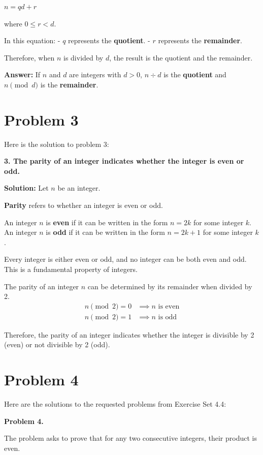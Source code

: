 \documentclass{article}
\begin{document}
$n = qd + r$

where $0 \le r < d$.

In this equation:
- $q$ represents the \textbf{quotient}.
- $r$ represents the \textbf{remainder}.

Therefore, when $n$ is divided by $d$, the result is the quotient and the remainder.

\textbf{Answer:}
If $n$ and $d$ are integers with $d > 0$, $n \div d$ is the \textbf{quotient} and $n \pmod{d}$ is the \textbf{remainder}.

\newpage

\section*{\textbf{Problem 3}}
Here is the solution to problem 3:

\textbf{3. The parity of an integer indicates whether the integer is even or odd.}

\textbf{Solution:}
Let $n$ be an integer.

\textbf{Parity} refers to whether an integer is even or odd.

An integer $n$ is \textbf{even} if it can be written in the form $n = 2k$ for some integer $k$.
An integer $n$ is \textbf{odd} if it can be written in the form $n = 2k + 1$ for some integer $k$.

Every integer is either even or odd, and no integer can be both even and odd. This is a fundamental property of integers.

The parity of an integer $n$ can be determined by its remainder when divided by 2.
\begin{align}
n \pmod{2} = 0 &\implies n \text{ is even} \\
n \pmod{2} = 1 &\implies n \text{ is odd}
\end{align}

Therefore, the parity of an integer indicates whether the integer is divisible by 2 (even) or not divisible by 2 (odd).

\newpage

\section*{\textbf{Problem 4}}
Here are the solutions to the requested problems from Exercise Set 4.4:

\textbf{Problem 4.}

The problem asks to prove that for any two consecutive integers, their product is even.
\end{document}
